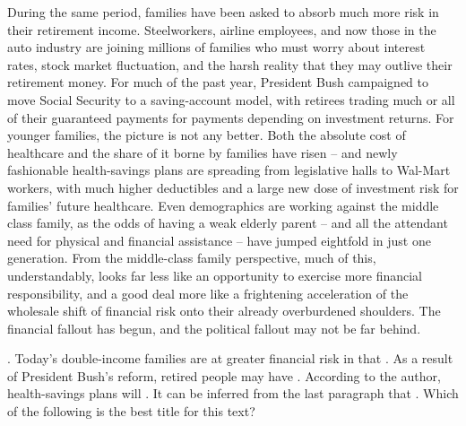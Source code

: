 During the same period, families have been asked to absorb much more risk in their retirement income. Steelworkers, airline employees, and now those in the auto industry are joining millions of families who must worry about interest rates, stock market fluctuation, and the harsh reality that they may outlive their retirement money. For much of the past year, President Bush campaigned to move Social Security to a saving-account model, with retirees trading much or all of their guaranteed payments for payments depending on investment returns. For younger families, the picture is not any better. Both the absolute cost of healthcare and the share of it borne by families have risen – and newly fashionable health-savings plans are spreading from legislative halls to Wal-Mart workers, with much higher deductibles and a large new dose of investment risk for families’ future healthcare. Even demographics are working against the middle class family, as the odds of having a weak elderly parent – and all the attendant need for physical and financial assistance – have jumped eightfold in just one generation.
From the middle-class family perspective, much of this, understandably, looks far less like an opportunity to exercise more financial responsibility, and a good deal more like a frightening acceleration of the wholesale shift of financial risk onto their already overburdened shoulders. The financial fallout has begun, and the political fallout may not be far behind.
\begin{questions}  .	Today’s double-income families are at greater financial risk in that
 .	As a result of President Bush’s reform, retired people may have
 .	According to the author, health-savings plans will
 .	It can be inferred from the last paragraph that
 .	Which of the following is the best title for this text?
\end{questions}

